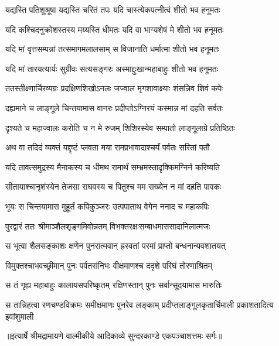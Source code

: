 \twolineshloka
{यद्यस्ति पतिशुश्रूषा यद्यस्ति चरितं तपः}
{यदि चास्त्येकपत्नीत्वं शीतो भव हनूमतः} %

\twolineshloka
{यदि कश्चिदनुक्रोशस्तस्य मय्यस्ति धीमतः}
{यदि वा भाग्यशेषं मे शीतो भव हनूमतः} %

\twolineshloka
{यदि मां वृत्तसम्पन्नां तत्समागमलालसाम्}
{स विजानाति धर्मात्मा शीतो भव हनूमतः} %

\twolineshloka
{यदि मां तारयत्यार्यः सुग्रीवः सत्यसङ्गरः}
{अस्माद्दुःखान्महाबाहुः शीतो भव हनूमतः} %

\twolineshloka
{ततस्तीक्ष्णार्चिरव्यग्रः प्रदक्षिणशिखोऽनलः}
{जज्वाल मृगशावाक्ष्याः शंसन्निव शिवं कपेः} %

\twolineshloka
{दह्यमाने च लाङ्गूले चिन्तयामास वानरः}
{प्रदीप्तोऽग्निरयं कस्मान्न मां दहति सर्वतः} %

\twolineshloka
{दृश्यते च महाज्वालः करोति च न मे रुजम्}
{शिशिरस्येव सम्पातो लाङ्गूलाग्रे प्रतिष्ठितः} %

\twolineshloka
{अथ वा तदिदं व्यक्तं यद्दृष्टं प्लवता मया}
{रामप्रभावादाश्चर्यं पर्वतः सरितां पतौ} %

\twolineshloka
{यदि तावत्समुद्रस्य मैनाकस्य च धीमथ}
{रामार्थं सम्भ्रमस्तादृक्किमग्निर्न करिष्यति} %

\twolineshloka
{सीतायाश्चानृशंस्येन तेजसा राघवस्य च}
{पितुश्च मम सख्येन न मां दहति पावकः} %

\twolineshloka
{भूयः स चिन्तयामास मुहूर्तं कपिकुञ्जरः}
{उत्पपाताथ वेगेन ननाद च महाकपिः} %

\twolineshloka
{पुरद्वारं ततः श्रीमाञ्शैलशृङ्गमिवोन्नतम्}
{विभक्तरक्षःसम्बाधमाससादानिलात्मजः} %

\twolineshloka
{स भूत्वा शैलसङ्काशः क्षणेन पुनरात्मवान्}
{ह्रस्वतां परमां प्राप्तो बन्धनान्यवशातयत्} %

\twolineshloka
{विमुक्तश्चाभवच्छ्रीमान् पुनः पर्वतसंनिभः}
{वीक्षमाणश्च ददृशे परिघं तोरणाश्रितम्} %

\twolineshloka
{स तं गृह्य महाबाहुः कालायसपरिष्कृतम्}
{रक्षिणस्तान् पुनः सर्वान्सूदयामास मारुतिः} %

\fourlineindentedshloka
{स तान्निहत्वा रणचण्डविक्रमः}
{समीक्षमाणः पुनरेव लङ्काम्}
{प्रदीप्तलाङ्गूलकृतार्चिमाली}
{प्रकाशतादित्य इवांशुमाली} %


{॥इत्यार्षे श्रीमद्रामायणे वाल्मीकीये आदिकाव्ये सुन्दरकाण्डे एकपञ्चाशत्तमः सर्गः॥}


